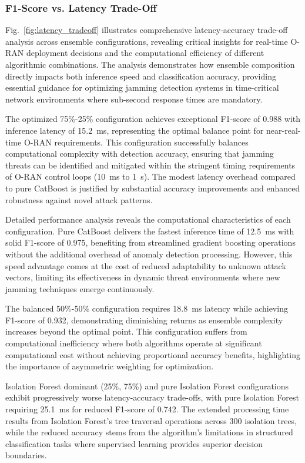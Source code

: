 \documentclass[journal]{IEEEtran}
\begin{document}
\subsubsection{F1-Score vs. Latency Trade-Off}

Fig.~\ref{fig:latency_tradeoff} illustrates comprehensive latency-accuracy trade-off analysis across ensemble configurations, revealing critical insights for real-time O-RAN deployment decisions and the computational efficiency of different algorithmic combinations. The analysis demonstrates how ensemble composition directly impacts both inference speed and classification accuracy, providing essential guidance for optimizing jamming detection systems in time-critical network environments where sub-second response times are mandatory.

The optimized 75\%-25\% configuration achieves exceptional F1-score of 0.988 with inference latency of 15.2~ms, representing the optimal balance point for near-real-time O-RAN requirements. This configuration successfully balances computational complexity with detection accuracy, ensuring that jamming threats can be identified and mitigated within the stringent timing requirements of O-RAN control loops (10~ms to 1~s). The modest latency overhead compared to pure CatBoost is justified by substantial accuracy improvements and enhanced robustness against novel attack patterns.

Detailed performance analysis reveals the computational characteristics of each configuration. Pure CatBoost delivers the fastest inference time of 12.5~ms with solid F1-score of 0.975, benefiting from streamlined gradient boosting operations without the additional overhead of anomaly detection processing. However, this speed advantage comes at the cost of reduced adaptability to unknown attack vectors, limiting its effectiveness in dynamic threat environments where new jamming techniques emerge continuously.

The balanced 50\%-50\% configuration requires 18.8~ms latency while achieving F1-score of 0.932, demonstrating diminishing returns as ensemble complexity increases beyond the optimal point. This configuration suffers from computational inefficiency where both algorithms operate at significant computational cost without achieving proportional accuracy benefits, highlighting the importance of asymmetric weighting for optimization.

Isolation Forest dominant (25\%, 75\%) and pure Isolation Forest configurations exhibit progressively worse latency-accuracy trade-offs, with pure Isolation Forest requiring 25.1~ms for reduced F1-score of 0.742. The extended processing time results from Isolation Forest's tree traversal operations across 300 isolation trees, while the reduced accuracy stems from the algorithm's limitations in structured classification tasks where supervised learning provides superior decision boundaries.
\end{document}
